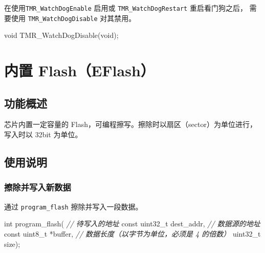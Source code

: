 \documentclass[
  12pt,
]{book}
\newenvironment{Shaded}{\begin{snugshade}}{\end{snugshade}}
\newcommand{\CommentTok}[1]{\textcolor[rgb]{0.56,0.35,0.01}{\textit{#1}}}
\newcommand{\DataTypeTok}[1]{\textcolor[rgb]{0.13,0.29,0.53}{#1}}
\newcommand{\NormalTok}[1]{#1}
\begin{document}
在使用\texttt{TMR\_WatchDogEnable} 启用或 \texttt{TMR\_WatchDogRestart} 重启看门狗之后，
需要使用 \texttt{TMR\_WatchDogDisable} 对其禁用。

\begin{Shaded}
\begin{Highlighting}[]
\DataTypeTok{void}\NormalTok{ TMR_WatchDogDisable(}\DataTypeTok{void}\NormalTok{);}
\end{Highlighting}
\end{Shaded}

\hypertarget{ch-eflash}{%
\chapter{内置 Flash（EFlash）}\label{ch-eflash}}

\hypertarget{ux529fux80fdux6982ux8ff0-8}{%
\section{功能概述}\label{ux529fux80fdux6982ux8ff0-8}}

芯片内置一定容量的 Flash，可编程擦写。擦除时以扇区（sector）为单位进行，
写入时以 32bit 为单位。

\hypertarget{ux4f7fux7528ux8bf4ux660e-9}{%
\section{使用说明}\label{ux4f7fux7528ux8bf4ux660e-9}}

\hypertarget{ux64e6ux9664ux5e76ux5199ux5165ux65b0ux6570ux636e}{%
\subsection{擦除并写入新数据}\label{ux64e6ux9664ux5e76ux5199ux5165ux65b0ux6570ux636e}}

通过 \texttt{program\_flash} 擦除并写入一段数据。

\begin{Shaded}
\begin{Highlighting}[]
\DataTypeTok{int}\NormalTok{ program_flash(}
    \CommentTok{// 待写入的地址}
    \DataTypeTok{const} \DataTypeTok{uint32_t}\NormalTok{ dest_addr,}
    \CommentTok{// 数据源的地址}
    \DataTypeTok{const} \DataTypeTok{uint8_t}\NormalTok{ *buffer,}
    \CommentTok{// 数据长度（以字节为单位，必须是 4 的倍数）}
    \DataTypeTok{uint32_t}\NormalTok{ size);}
\end{Highlighting}
\end{Shaded}
\end{document}
